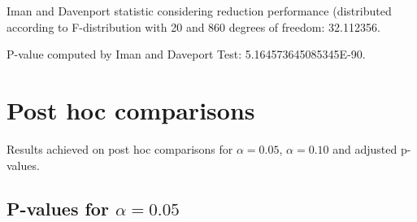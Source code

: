 \documentclass[a4paper,10pt]{article}
\begin{document}
\begin{landscape}
Iman and Davenport statistic considering reduction performance (distributed according to F-distribution with 20 and 860 degrees of freedom: 32.112356.

P-value computed by Iman and Daveport Test: 5.164573645085345E-90.\newline



\pagebreak

\section{Post hoc comparisons}

Results achieved on post hoc comparisons for $\alpha = 0.05$, $\alpha = 0.10$ and adjusted p-values.

\subsection{P-values for $\alpha=0.05$}


\end{landscape}
\end{document}
